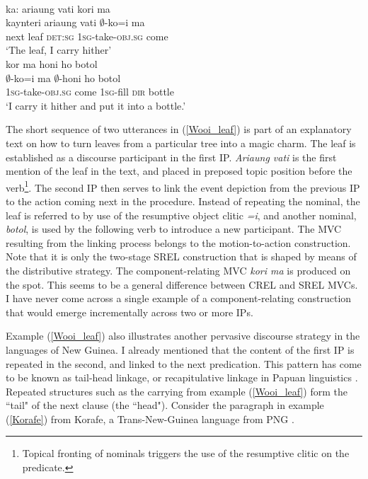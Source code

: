 \ea \label{Wooi_leaf}
\\
\ea
\glll ka: ariaung vati kori ma \\
kaynteri ariaung vati $\emptyset$-ko=i ma \\
next leaf \textsc{det}:\textsc{sg} \textsc{1}\textsc{sg}-take-\textsc{obj}.\textsc{sg} come \\
\glft `The leaf, I carry hither' \\ 
\ex
\glll kor ma honi ho botol \\
$\emptyset$-ko=i ma $\emptyset$-honi ho botol \\
\textsc{1}\textsc{sg}-take-\textsc{obj}.\textsc{sg} come \textsc{1}\textsc{sg}-fill \textsc{dir} bottle \\
\glft `I carry it hither and put it into a bottle.'\\
\z
\z

The short sequence of two utterances in (\ref{Wooi_leaf}) is part of an explanatory text on how to turn leaves from a particular tree into a magic charm. The leaf is established as a discourse participant in the first IP. \textit{Ariaung vati} is the first mention of the leaf in the text, and placed in preposed topic position before the verb\footnote{Topical fronting of nominals triggers the use of the resumptive clitic on the predicate.}. The second IP then serves to link the event depiction from the previous IP to the action coming next in the procedure. Instead of repeating the nominal, the leaf is referred to by use of the resumptive object clitic \textit{=i}, and another nominal, \textit{botol}, is used by the following verb to introduce a new participant. The MVC resulting from the linking process belongs to the motion-to-action construction. Note that it is only the two-stage SREL construction that is shaped by means of the distributive strategy. The component-relating MVC \textit{kori ma} is produced on the spot. This seems to be a general difference between CREL and SREL MVCs. I have never come across a single example of a component-relating construction that would emerge incrementally across two or more IPs.

Example (\ref{Wooi_leaf}) also illustrates another pervasive discourse strategy in the languages of New Guinea. I already mentioned that the content of the first IP is repeated in the second, and linked to the next predication. This pattern has come to be known as tail-head linkage, or recapitulative linkage in Papuan linguistics \citep{devries2005towards, devries2006areal}. Repeated structures such as the carrying from example (\ref{Wooi_leaf}) form the ``tail" of the next clause (the ``head"). Consider the paragraph in example (\ref{Korafe}) from Korafe, a Trans-New-Guinea language from PNG \citep{farr1999interface}.

